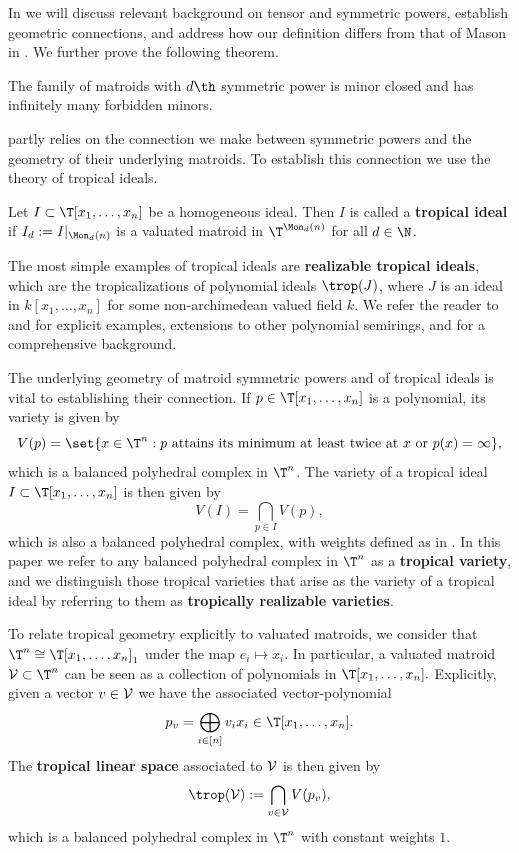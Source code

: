 In  we will discuss relevant background on tensor and symmetric powers, establish geometric connections, and address how our definition differs from that of Mason in \cite{MGlueing}. We further prove the following theorem.

\begin{theorem}\label{thm:introThm0}
    The family of matroids with $d\th$ symmetric power is minor closed and has infinitely many forbidden minors.
\end{theorem}

 partly relies on the connection we make between symmetric powers and the geometry of their underlying matroids. To establish this connection we use the theory of tropical ideals.

\begin{definition}\label{def:tropicalIdeals}
    Let $I\subset \T[x_1,\dots,x_n]$ be a homogeneous ideal. Then $I$ is called a \textbf{tropical ideal} if $I_d:=I|_{\Mon_d(n)}$ is a valuated matroid in $\T^{\Mon_d(n)}$ for all $d\in \N$. 
\end{definition}

The most simple examples of tropical ideals are \textbf{realizable tropical ideals}, which are the tropicalizations of polynomial ideals $\trop(J)$, where $J$ is an ideal in $k[x_1,\dots,x_n]$ for some non-archimedean valued field $k$. We refer the reader to \cite{MR18} and \cite{MR20} for explicit examples, extensions to other polynomial semirings, and for a comprehensive background.

The underlying geometry of matroid symmetric powers and of tropical ideals is vital to establishing their connection. If $p\in \T[x_1,\dots,x_n]$ is a polynomial, its variety is given by
$$V(p)=\set{x\in \T^n: p \text{ attains its minimum at least twice at } x \text{ or } p(x)=\infty},$$
which is a balanced polyhedral complex in $\T^n$. The variety of a tropical ideal $I\subset \T[x_1,\dots,x_n]$ is then given by
$$V(I)=\bigcap_{p\in I}V(p),$$
which is also a balanced polyhedral complex, with weights defined as in \cite{MR20}. In this paper we refer to any balanced polyhedral complex in $\T^n$ as a \textbf{tropical variety}, and we distinguish those tropical varieties that arise as the variety of a tropical ideal by referring to them as \textbf{tropically realizable varieties}. 


To relate tropical geometry explicitly to valuated matroids, we consider that $\T^n\cong \T[x_1,\dots,x_n]_1$ under the map $e_i\mapsto x_i$. In particular, a valuated matroid $\sV\subset \T^n$ can be seen as a collection of polynomials in $\T[x_1,\dots,x_n].$ Explicitly, given a vector $v\in \mathcal{V}$ we have the associated vector-polynomial
$$p_v = \bigoplus_{i\in [n]} v_ix_i\in \T[x_1,\dots,x_n].$$
The \textbf{tropical linear space} associated to $\mathcal{V}$ is then given by
$$\trop(\sV) := \bigcap_{v\in \sV}V(p_v),$$
which is a balanced polyhedral complex in $\T^n$ with constant weights $1$.

